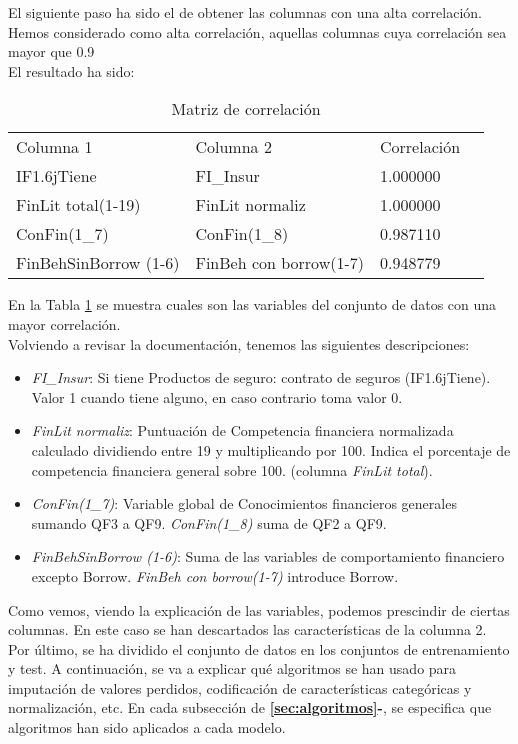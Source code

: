 \clearpage
El siguiente paso ha sido el de obtener las columnas con una alta correlación. Hemos considerado como alta correlación, aquellas columnas cuya correlación sea mayor que 0.9\\
El resultado ha sido: \\
\begin{table}[H]
	\centering
	\begin{tabular}{|l|l|l|l|}
		\cline{1-3}
		Columna 1             & Columna 2              & Correlación \\ \cline{1-3}
		IF1.6jTiene           & FI\_Insur              & 1.000000    \\ \cline{1-3}
		FinLit total(1-19)    & FinLit normaliz        & 1.000000    \\ \cline{1-3}
		ConFin(1\_7)          & ConFin(1\_8)           & 0.987110    \\ \cline{1-3}
		FinBehSinBorrow (1-6) & FinBeh con borrow(1-7) & 0.948779    \\ \cline{1-3}
	\end{tabular}
	\caption{Matriz de correlación}
	\label{tab:correlacion}
\end{table}
En la Tabla \ref{tab:correlacion} se muestra cuales son las variables del conjunto de datos con una mayor correlación.\\
Volviendo a revisar la documentación, tenemos las siguientes descripciones:
\linebreak
\begin{itemize}
	\item \textit{FI\_Insur}: Si tiene Productos de seguro: contrato de seguros (IF1.6jTiene). Valor 1 cuando tiene alguno, en caso contrario toma valor 0.
	\item \textit{FinLit normaliz}: Puntuación de Competencia financiera normalizada calculado dividiendo entre 19 y multiplicando por 100. Indica el porcentaje de competencia financiera general sobre 100. (columna \textit{FinLit total}).
	\item \textit{ConFin(1\_7)}: Variable global de Conocimientos financieros generales sumando QF3 a QF9. \textit{ConFin(1\_8)} suma de QF2 a QF9.
	\item \textit{FinBehSinBorrow (1-6)}: Suma de las variables de comportamiento financiero excepto Borrow. \textit{FinBeh con borrow(1-7) } introduce Borrow.
\end{itemize}
Como vemos, viendo la explicación de las variables, podemos prescindir de ciertas columnas. En este caso se han descartados las características de la columna 2.\\
\linebreak
Por último, se ha dividido el conjunto de datos en los conjuntos de entrenamiento y test.
\linebreak
A continuación, se va a explicar qué algoritmos se han usado para imputación de valores perdidos, codificación de características categóricas y normalización, etc. En cada subsección de \textbf{\ref{sec:algoritmos}-}, se especifica que algoritmos han sido aplicados a cada modelo.

